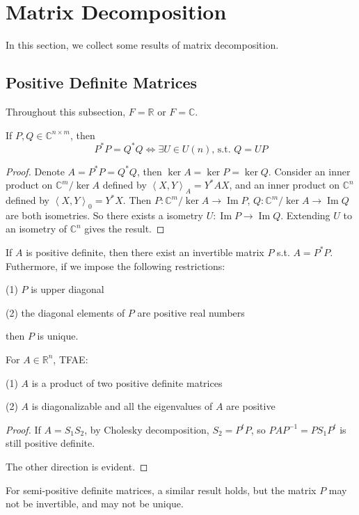 \section{Matrix Decomposition}
In this section, we collect some results of matrix decomposition. 

\subsection{Positive Definite Matrices}
Throughout this subsection, $F=\mathbb{R}$ or $F=\mathbb{C}$.
\begin{lemma}
    If $P,Q\in \mathbb{C}^{n\times m}$, then 
    \[P^*P=Q^*Q\Longleftrightarrow \exists U\in U(n)\text{, s.t. }Q=UP\]
\end{lemma}
\begin{proof}
    Denote $A=P^*P=Q^*Q$, then $\ker A=\ker P=\ker Q$. Consider an inner product on $\mathbb{C}^m/\ker A$ defined by $\left\langle X,Y\right\rangle _A=Y^*AX$, and
an inner product on $\mathbb{C}^n$ defined by $\left\langle X,Y\right\rangle _0=Y^*X$. Then $P:\mathbb{C}^m/\ker A\to \operatorname{Im}P$, $Q:\mathbb{C}^m/\ker A\to\operatorname{Im}Q$ are both isometries.
So there exists a isometry $U:\operatorname{Im}P\to\operatorname{Im}Q$. Extending $U$ to an isometry of $\mathbb{C}^n$ gives the result.
\end{proof}
\begin{theorem}
    If $A$ is positive definite, then there exist an invertible matrix $P$ s.t. $A=P^*P$. Futhermore, if we impose the following restrictions:\par
    (1) $P$ is upper diagonal\par
    (2) the diagonal elements of $P$ are positive real numbers\par
    then $P$ is unique.
\end{theorem}
\begin{example}
    For $A\in\mathbb{R}^n$, TFAE:\par
    (1) $A$ is a product of two positive definite matrices\par
    (2) $A$ is diagonalizable and all the eigenvalues of $A$ are positive

\end{example}
\begin{proof}
    If $A=S_1S_2$, by Cholesky decomposition, $S_2=P^tP$, so $PAP^{-1}=PS_1P^t$ is still positive definite.\par
    The other direction is evident.
\end{proof}
\begin{remark}
    For semi-positive definite matrices, a similar result holds, but the matrix $P$ may not be invertible, and may not be unique.
\end{remark}

